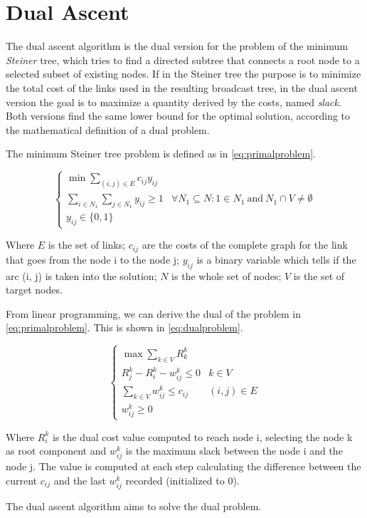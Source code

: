 \chapter{Dual Ascent}\label{ch:dualascent}

The dual ascent algorithm is the dual version for the problem of the minimum
\emph{Steiner} tree, which tries to find a directed subtree that connects a
root node to a selected subset of existing nodes. If in the Steiner tree the
purpose is to minimize the total cost of the links used in the resulting
broadcast tree, in the dual ascent version the goal is to maximize a quantity
derived by the costs, named \emph{slack}. Both versions find the same lower
bound for the optimal solution, according to the mathematical definition of a
dual problem.

The minimum Steiner tree problem is defined as in \eqref{eq:primalproblem}.

\begin{equation}\label{eq:primalproblem}
	\begin{cases}
		\min\sum\limits_{(i,j) \in E} c_{ij}y_{ij}\\
		\sum\limits_{i \in N_1} \sum\limits_{j \in \overline{N_1}}
		y_{ij} \geq 1 & \forall N_1 \subseteq N : 1 \in N_1\
		\mathrm{and}\ N_1 \cap V \neq \emptyset\\
		y_{ij} \in \{0, 1\}
	\end{cases}
\end{equation}

Where \(E\) is the set of links; \(c_{ij}\) are the costs of the complete graph
for the link that goes from the node i to the node j; \(y_{ij}\) is a binary
variable which tells if the arc (i, j) is taken into the solution; \(N\) is the
whole set of nodes; \(V\) is the set of target nodes.

From linear programming, we can derive the dual of the problem in
\eqref{eq:primalproblem}. This is shown in \eqref{eq:dualproblem}.

\begin{equation}\label{eq:dualproblem}
	\begin{cases}
		\max\sum\limits_{k \in V} R_k^k\\
		R_j^k - R_i^k - w_{ij}^k \leq 0 & k \in V\\
		\sum\limits_{k \in V} w_{ij}^k \leq c_{ij} & (i, j) \in E\\
		w_{ij}^k \geq 0
	\end{cases}
\end{equation}

Where \(R_i^k\) is the dual cost value computed to reach node i, selecting the
node k as root component and \(w_{ij}^k\) is the maximum slack between
the node i and the node j. The value is computed at each step calculating the
difference between the current \(c_{ij}\) and the last \(w_{ij}^k\) recorded
(initialized to 0).

The dual ascent algorithm aims to solve the dual problem.



